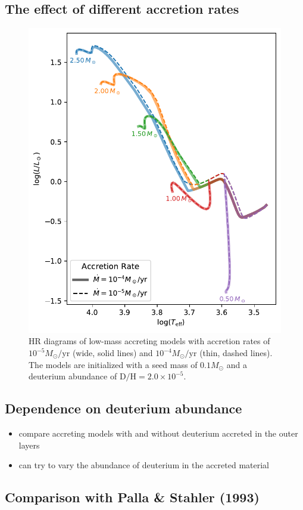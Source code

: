 \documentclass[12pt,a4paper]{article}
\newcommand{\mr}{\mathrm}
\newenvironment{outline}[1]{%
  \begin{itemize}[label=\textbullet]%
  \color{#1}%
}{%
  \end{itemize}%
}
\begin{document}
\subsection{The effect of different accretion rates}
\label{sec:accretion_rate}

\begin{figure}
  \centering  
  \includegraphics[width=.65\textwidth,keepaspectratio]{comp_accrete.pdf}
  \caption{HR diagrams of low-mass accreting models with accretion rates of $10^{-5} M_\odot/\mr{yr}$ (wide, solid lines) and $10^{-4} M_\odot/\mr{yr}$ (thin, dashed lines). The models are initialized with a seed mass of $0.1 M_\odot$ and a deuterium abundance of $\mr{D/H} = 2.0\times 10^{-5}$.} \label{fig:comp_accrete}
\end{figure}

\subsection{Dependence on deuterium abundance}
\label{sec:deuterium_abundance}

\begin{outline}{gray}
  \item compare accreting models with and without deuterium accreted in the outer layers
  \item can try to vary the abundance of deuterium in the accreted material
\end{outline}

\subsection{Comparison with Palla \& Stahler (1993)}
\label{sec:comp_palla_stahler}
\end{document}
